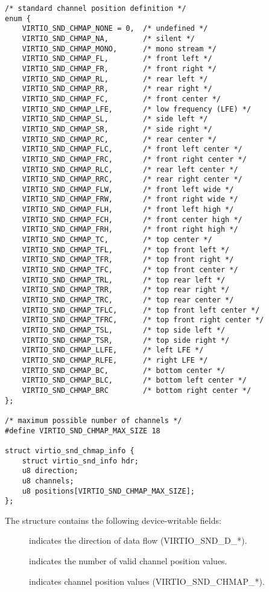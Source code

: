 \begin{lstlisting}
/* standard channel position definition */
enum {
    VIRTIO_SND_CHMAP_NONE = 0,  /* undefined */
    VIRTIO_SND_CHMAP_NA,        /* silent */
    VIRTIO_SND_CHMAP_MONO,      /* mono stream */
    VIRTIO_SND_CHMAP_FL,        /* front left */
    VIRTIO_SND_CHMAP_FR,        /* front right */
    VIRTIO_SND_CHMAP_RL,        /* rear left */
    VIRTIO_SND_CHMAP_RR,        /* rear right */
    VIRTIO_SND_CHMAP_FC,        /* front center */
    VIRTIO_SND_CHMAP_LFE,       /* low frequency (LFE) */
    VIRTIO_SND_CHMAP_SL,        /* side left */
    VIRTIO_SND_CHMAP_SR,        /* side right */
    VIRTIO_SND_CHMAP_RC,        /* rear center */
    VIRTIO_SND_CHMAP_FLC,       /* front left center */
    VIRTIO_SND_CHMAP_FRC,       /* front right center */
    VIRTIO_SND_CHMAP_RLC,       /* rear left center */
    VIRTIO_SND_CHMAP_RRC,       /* rear right center */
    VIRTIO_SND_CHMAP_FLW,       /* front left wide */
    VIRTIO_SND_CHMAP_FRW,       /* front right wide */
    VIRTIO_SND_CHMAP_FLH,       /* front left high */
    VIRTIO_SND_CHMAP_FCH,       /* front center high */
    VIRTIO_SND_CHMAP_FRH,       /* front right high */
    VIRTIO_SND_CHMAP_TC,        /* top center */
    VIRTIO_SND_CHMAP_TFL,       /* top front left */
    VIRTIO_SND_CHMAP_TFR,       /* top front right */
    VIRTIO_SND_CHMAP_TFC,       /* top front center */
    VIRTIO_SND_CHMAP_TRL,       /* top rear left */
    VIRTIO_SND_CHMAP_TRR,       /* top rear right */
    VIRTIO_SND_CHMAP_TRC,       /* top rear center */
    VIRTIO_SND_CHMAP_TFLC,      /* top front left center */
    VIRTIO_SND_CHMAP_TFRC,      /* top front right center */
    VIRTIO_SND_CHMAP_TSL,       /* top side left */
    VIRTIO_SND_CHMAP_TSR,       /* top side right */
    VIRTIO_SND_CHMAP_LLFE,      /* left LFE */
    VIRTIO_SND_CHMAP_RLFE,      /* right LFE */
    VIRTIO_SND_CHMAP_BC,        /* bottom center */
    VIRTIO_SND_CHMAP_BLC,       /* bottom left center */
    VIRTIO_SND_CHMAP_BRC        /* bottom right center */
};

/* maximum possible number of channels */
#define VIRTIO_SND_CHMAP_MAX_SIZE 18

struct virtio_snd_chmap_info {
    struct virtio_snd_info hdr;
    u8 direction;
    u8 channels;
    u8 positions[VIRTIO_SND_CHMAP_MAX_SIZE];
};
\end{lstlisting}

The structure contains the following device-writable fields:

\begin{description}
\item[] indicates the direction of data flow (VIRTIO_SND_D_*).
\item[] indicates the number of valid channel position values.
\item[] indicates channel position values (VIRTIO_SND_CHMAP_*).
\end{description}

